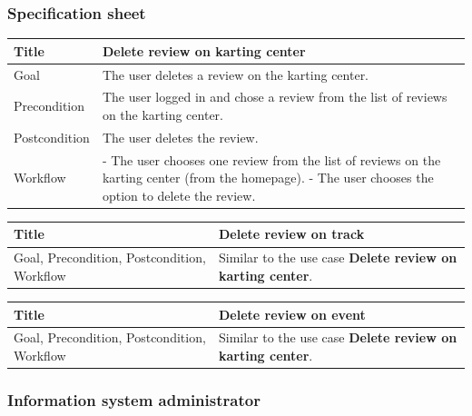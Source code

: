 \documentclass{beamer}
\begin{document}
\begin{frame}
    \frametitle{Specification sheet}
    \begin{table}
        \tiny
        \begin{tabular}{|p{2cm}|p{6cm}|}
        \hline  
        Title & \textbf{Delete review on karting center} \\
        \hline
        Goal & The user deletes a review on the karting center. \\
        \hline
        Precondition & The user logged in and chose a review from the list of reviews on the karting center. \\
        \hline
        Postcondition & The user deletes the review. \\
        \hline
        Workflow &
        - The user chooses one review from the list of reviews on the karting center (from the homepage). \newline
        - The user chooses the option to delete the review. \\
        \hline
        \end{tabular}
    \end{table}

    \begin{table}
        \tiny
        \begin{tabular}{|p{2cm}|p{6cm}|}
        \hline  
        Title & \textbf{Delete review on track} \\
        \hline
        Goal, Precondition, Postcondition, Workflow & Similar 
        to the use case \textbf{Delete review on karting center}. \\
        \hline
        \end{tabular}
    \end{table}

    \begin{table}
        \tiny
        \begin{tabular}{|p{2cm}|p{6cm}|}
        \hline  
        Title & \textbf{Delete review on event} \\
        \hline
        Goal, Precondition, Postcondition, Workflow & Similar 
        to the use case \textbf{Delete review on karting center}. \\
        \hline
        \end{tabular}
    \end{table}

\end{frame}

\subsubsection*{Information system administrator}
\end{document}
